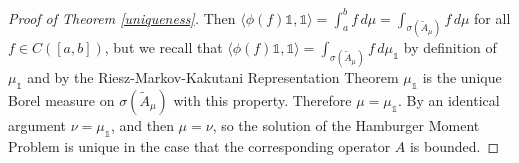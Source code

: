 \documentclass[12pt,oneside]{report}
\begin{document}
\begin{proof}[Proof of Theorem \ref{uniqueness}]
    Then $\langle \phi(f)\mathds{1}, \mathds{1} \rangle = \int _{a}^{b} f \, d\mu = \int _{\sigma(\tilde{A}_{\mu})} f \, d\mu$ for all $f \in C([a,b])$, but we recall that $\langle \phi(f)\mathds{1}, \mathds{1} \rangle = \int _{\sigma(\tilde{A}_{\mu})} f \, d\mu_{\mathds{1}}$ by definition of $\mu_{\mathds{1}}$ and by the Riesz-Markov-Kakutani Representation Theorem $\mu_{\mathds{1}}$ is the unique Borel measure on $\sigma(\tilde{A}_{\mu})$ with this property. Therefore $\mu = \mu_\mathds{1}$. By an identical argument $\nu = \mu_\mathds{1}$, and then $\mu = \nu$, so the solution of the Hamburger Moment Problem is unique in the case that the corresponding operator $A$ is bounded.
\end{proof}




\end{document}
